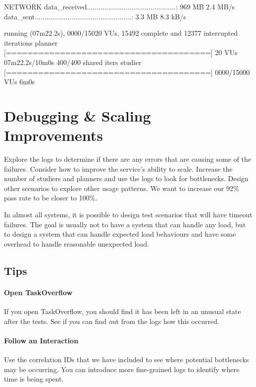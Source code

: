 \documentclass{csse4400}
\begin{document}
\begin{code}[language=bash,numbers=none]{}
    NETWORK
    data_received..............................................: 969 MB 2.4 MB/s
    data_sent..................................................: 3.3 MB 8.3 kB/s




running (07m22.2s), 0000/15020 VUs, 15492 complete and 12377 interrupted iterations
planner [======================================] 20 VUs          07m22.2s/10m0s  400/400 shared iters
studier [======================================] 0000/15000 VUs  6m0s
\end{code}



\section{Debugging \& Scaling Improvements}

Explore the logs to determine if there are any errors that are causing some of the failures.
Consider how to improve the service's ability to scale.
Increase the number of studiers and planners and use the logs to look for bottlenecks.
Design other scenarios to explore other usage patterns.
We want to increase our 92\% pass rate to be closer to 100\%.

In almost all systems, it is possible to design test scenarios that will have timeout failures.
The goal is usually not to have a system that can handle any load,
but to design a system that can handle expected load behaviours
and have some overhead to handle reasonable unexpected load.

\subsection{Tips}

\paragraph{Open TaskOverflow}
If you open TaskOverflow,
you should find it has been left in an unusual state after the tests.
See if you can find out from the logs how this occurred.

\paragraph{Follow an Interaction}
Use the correlation IDs that we have included to see where potential bottlenecks may be occurring.
You can introduce more fine-grained logs to identify where time is being spent.
\end{document}
